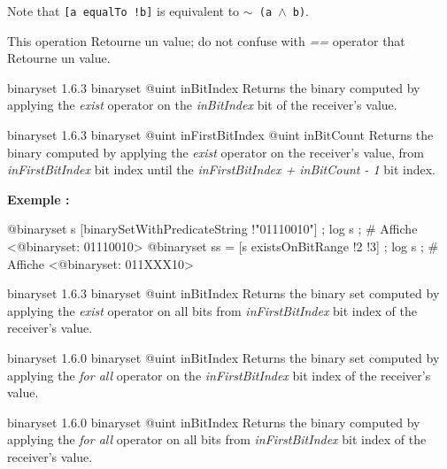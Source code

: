 Note that \texttt{[a equalTo !b]} is equivalent to \texttt{$\sim$ (a $\wedge$ b)}.

This operation Retourne un  value; do not confuse with \emph{==} operator that Retourne un  value.







{binaryset}
{1.6.3}
{binaryset}
{@uint inBitIndex}
{Returns the binary computed by applying the \emph{exist} operator on the \emph{inBitIndex} bit of the receiver's value.}
{}







{binaryset}
{1.6.3}
{binaryset}
{@uint inFirstBitIndex}
{@uint inBitCount}
{Returns the binary computed by applying the \emph{exist} operator on the receiver's value, from \emph{inFirstBitIndex} bit index until the \emph{inFirstBitIndex + inBitCount - 1} bit index.}
{}


\textbf{Exemple :}
\begin{galgascode}
@binaryset s [binarySetWithPredicateString !"01110010"] ;
log s ; # Affiche <@binaryset: 01110010>
@binaryset ss = [s existsOnBitRange !2 !3] ;
log s ; # Affiche <@binaryset: 011XXX10>
\end{galgascode}







{binaryset}
{1.6.3}
{binaryset}
{@uint inBitIndex}
{Returns the binary set computed by applying the \emph{exist} operator on all bits from \emph{inFirstBitIndex} bit index of the receiver's value.}
{}







{binaryset}
{1.6.0}
{binaryset}
{@uint inBitIndex}
{Returns the binary set computed by applying the \emph{for all} operator on the \emph{inFirstBitIndex} bit index of the receiver's value.}
{}







{binaryset}
{1.6.0}
{binaryset}
{@uint inBitIndex}
{Returns the binary computed by applying the \emph{for all} operator on all bits from \emph{inFirstBitIndex} bit index of the receiver's value.}
{}








